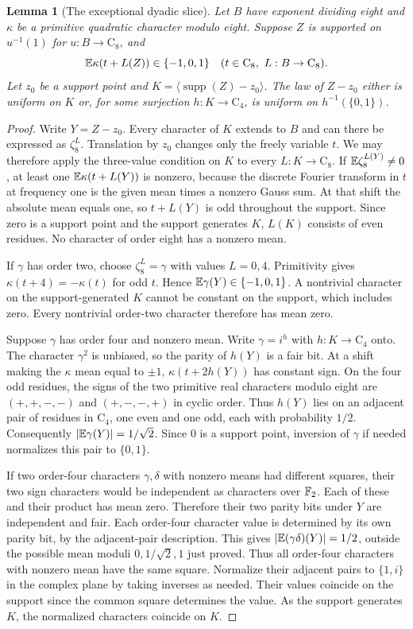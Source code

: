 \documentclass[11pt,letterpaper]{article}
\newtheorem{lemma}[theorem]{Lemma}
\newcommand{\supp}{\operatorname{supp}}\newcommand{\ord}{\operatorname{ord}}
\newcommand{\Cyc}{\mathrm C}
\newcommand{\z}{\zeta}
\begin{document}
\begin{lemma}[The exceptional dyadic slice]\label{lem:dyadic}
Let $B$ have exponent dividing eight and $\kappa$ be a primitive quadratic character modulo eight. Suppose $Z$ is supported on $u^{-1}(1)$ for $u:B\to\Cyc_8$, and
\[
 \E\kappa(t+L(Z))\in\{-1,0,1\}
 \quad(t\in\Cyc_8,\ L:B\to\Cyc_8).
\]
Let $z_0$ be a support point and $K=\langle\supp(Z)-z_0\rangle$. The law of $Z-z_0$ either is uniform on $K$ or, for some surjection $h:K\to\Cyc_4$, is uniform on $h^{-1}(\{0,1\})$.
\end{lemma}
\begin{proof}
Write $Y=Z-z_0$. Every character of $K$ extends to $B$ and can there be expressed as $\z_8^L$. Translation by $z_0$ changes only the freely variable $t$. We may therefore apply the three-value condition on $K$ to every $L:K\to\Cyc_8$. If $\E\z_8^{L(Y)}\ne0$, at least one $\mathbb E\kappa(t+L(Y))$ is nonzero, because the discrete Fourier transform in $t$ at frequency one is the given mean times a nonzero Gauss sum. At that shift the absolute mean equals one, so $t+L(Y)$ is odd throughout the support. Since zero is a support point and the support generates $K$, $L(K)$ consists of even residues. No character of order eight has a nonzero mean.

If $\gamma$ has order two, choose $\z_8^{L}=\gamma$ with values $L=0,4$. Primitivity gives $\kappa(t+4)=-\kappa(t)$ for odd $t$. Hence $\mathbb E\gamma(Y)\in\{-1,0,1\}$. A nontrivial character on the support-generated $K$ cannot be constant on the support, which includes zero. Every nontrivial order-two character therefore has mean zero.

Suppose $\gamma$ has order four and nonzero mean. Write $\gamma=i^h$ with $h:K\to\Cyc_4$ onto. The character $\gamma^2$ is unbiased, so the parity of $h(Y)$ is a fair bit. At a shift making the $\kappa$ mean equal to $\pm1$, $\kappa(t+2h(Y))$ has constant sign. On the four odd residues, the signs of the two primitive real characters modulo eight are $(+,+,-,-)$ and $(+,-,-,+)$ in cyclic order. Thus $h(Y)$ lies on an adjacent pair of residues in $\Cyc_4$, one even and one odd, each with probability $1/2$. Consequently $|\mathbb E\gamma(Y)|=1/\sqrt2$. Since $0$ is a support point, inversion of $\gamma$ if needed normalizes this pair to $\{0,1\}$.

If two order-four characters $\gamma,\delta$ with nonzero means had different squares, their two sign characters would be independent as characters over $\mathbb F_2$. Each of these and their product has mean zero. Therefore their two parity bits under $Y$ are independent and fair. Each order-four character value is determined by its own parity bit, by the adjacent-pair description. This gives $|\mathbb E(\gamma\delta)(Y)|=1/2$, outside the possible mean moduli $0,1/\sqrt2,1$ just proved. Thus all order-four characters with nonzero mean have the same square. Normalize their adjacent pairs to $\{1,i\}$ in the complex plane by taking inverses as needed. Their values coincide on the support since the common square determines the value. As the support generates $K$, the normalized characters coincide on $K$.


\end{proof}
\end{document}
